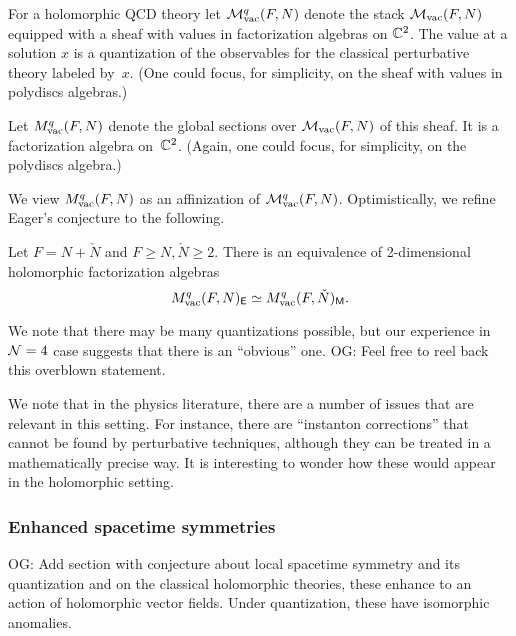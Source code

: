 \documentclass[11pt]{amsart}
\def\owen#1{{\textcolor{violet!65!black}{OG: {#1}}}}
\begin{document}
\begin{dfn}
For a holomorphic QCD theory let $\mathcal M^q_{\rm vac}(F,N)$ denote the stack $\mathcal M_{\rm vac}(F,N)$ equipped with a sheaf with values in factorization algebras on $\mathbb C^2$.
The value at a solution $x$ is a quantization of the observables for the classical perturbative theory labeled by~$x$.
(One could focus, for simplicity, on the sheaf with values in polydiscs algebras.)

Let $M^q_{\rm vac}(F,N)$ denote the global sections over $\mathcal M_{\rm vac}(F,N)$ of this sheaf. 
It is a factorization algebra on~$\mathbb C^2$.
(Again, one could focus, for simplicity, on the polydiscs algebra.)
\end{dfn}

We view $M^q_{\rm vac}(F,N)$ as an affinization of $\mathcal M^q_{\rm vac}(F,N)$.
Optimistically, we refine Eager's conjecture to the following. 

\begin{conj}
Let $F = N + \check{N}$ and $F \geq N, \check{N} \geq 2$.
There is an equivalence of 2-dimensional holomorphic factorization algebras
\[
M^q_{\rm vac}(F,N)_{\mathsf E} \simeq M^q_{\rm vac}(F,\check{N})_{{\sf M}}.
\]
\end{conj}

We note that there may be many quantizations possible, but our experience in $\mathcal N=4$ case suggests that there is an ``obvious'' one.
\owen{Feel free to reel back this overblown statement.}

We note that in the physics literature, there are a number of issues that are relevant in this setting.
For instance, there are ``instanton corrections'' that cannot be found by perturbative techniques, although they can be treated in a mathematically precise way. 
It is interesting to wonder how these would appear in the holomorphic setting.

\subsubsection{Enhanced spacetime symmetries}

\owen{Add section with conjecture about local spacetime symmetry and its quantization}
and on the classical holomorphic theories, these enhance to an action of holomorphic vector fields. Under quantization, these have isomorphic anomalies.
\end{document}
